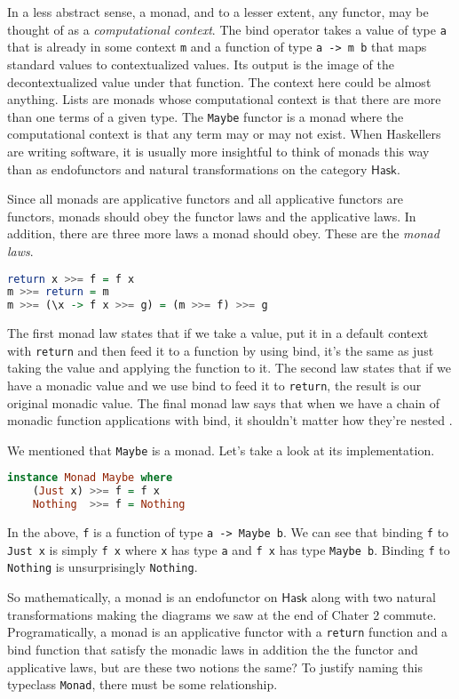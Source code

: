 \documentclass[MS, xcolor=dvipsnames]{wfuthesis}
\def\Hask{\mathsf{Hask}}
\theoremstyle{definition}
\begin{document}
In a less abstract sense, a monad, and to a lesser extent, any functor, may be thought of as a \emph{computational context}. The bind operator takes a value of type \lstinline{a} that is already in some context \lstinline{m} and a function of type \lstinline{a -> m b} that maps standard values to contextualized values. Its output is the image of the decontextualized value under that function. The context here could be almost anything. Lists are monads whose computational context is that there are more than one terms of a given type. The \lstinline{Maybe} functor is a monad where the computational context is that any term may or may not exist. When Haskellers are writing software, it is usually more insightful to think of monads this way than as endofunctors and natural transformations on the category $\Hask$. \par 
Since all monads are applicative functors and all applicative functors are functors, monads should obey the functor laws and the applicative laws. In addition, there are three more laws a monad should obey. These are the \emph{monad laws}.
\begin{lstlisting}[language=Haskell]
return x >>= f = f x
m >>= return = m
m >>= (\x -> f x >>= g) = (m >>= f) >>= g
\end{lstlisting}
The first monad law states that if we take a value, put it in a default context with \lstinline{return} and then feed it to a function by using bind, it's the same as just taking the value and applying the function to it. The second law states that if we have a monadic value and we use bind to feed it to \lstinline{return}, the result is our original monadic value. The final monad law says that when we have a chain of monadic function applications with bind, it shouldn't matter how they're nested \cite{Lipovaca2011}. \par 
We mentioned that \lstinline{Maybe} is a monad. Let's take a look at its implementation. 
\begin{lstlisting}[language=Haskell]
instance Monad Maybe where
    (Just x) >>= f = f x
    Nothing  >>= f = Nothing
\end{lstlisting}
In the above, \lstinline{f} is a function of type \lstinline{a -> Maybe b}. We can see that binding \lstinline{f} to \lstinline{Just x} is simply \lstinline{f x} where \lstinline{x} has type \lstinline{a} and \lstinline{f x} has type \lstinline{Maybe b}. Binding \lstinline{f} to \lstinline{Nothing} is unsurprisingly \lstinline{Nothing}. \par 
So mathematically, a monad is an endofunctor on $\Hask$ along with two natural transformations making the diagrams we saw at the end of Chater 2 commute. Programatically, a monad is an applicative functor with a \lstinline{return} function and a bind function that satisfy the monadic laws in addition the the functor and applicative laws, but are these two notions the same? To justify naming this typeclass \lstinline{Monad}, there must be some relationship. \par 
\end{document}
